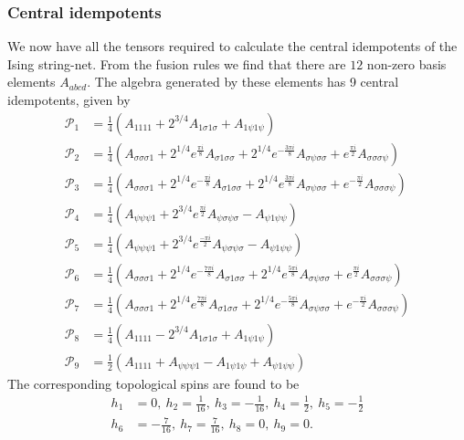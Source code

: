\documentclass[12 pt]{article}
\begin{document}
\subsubsection{Central idempotents}
We now have all the tensors required to calculate the central idempotents of the Ising string-net.
From the fusion rules we find that there are $12$ non-zero basis elements $A_{abcd}$. The algebra generated by these elements has 9 central idempotents, given by
\begin{align*}
\mathcal{P}_1 &=\frac{1}{4}\left(A_{1111}+2^{3/4}A_{1\sigma 1\sigma}+A_{1\psi 1\psi}\right)\\
\mathcal{P}_2 &=\frac{1}{4}\left(A_{\sigma\sigma \sigma 1}+2^{1/4}e^{\frac{\pi i}{8}}A_{\sigma 1\sigma\sigma}+2^{1/4}e^{-\frac{3\pi i}{8}}A_{\sigma\psi\sigma\sigma}+e^{\frac{\pi i}{2}}A_{\sigma\sigma\sigma\psi} \right)\\
\mathcal{P}_3 &=\frac{1}{4}\left(A_{\sigma\sigma \sigma 1}+2^{1/4}e^{-\frac{\pi i}{8}}A_{\sigma 1\sigma\sigma}+2^{1/4}e^{\frac{3\pi i}{8}}A_{\sigma \psi\sigma\sigma}+e^{-\frac{\pi i}{2}}A_{\sigma\sigma\sigma\psi} \right)\\
\mathcal{P}_4 &=\frac{1}{4}\left(A_{\psi\psi\psi1}+2^{3/4}e^{\frac{\pi i}{2}}A_{\psi\sigma\psi\sigma}-A_{\psi 1\psi\psi}\right)\\
\mathcal{P}_5 &=\frac{1}{4}\left(A_{\psi\psi\psi1}+2^{3/4}e^{\frac{-\pi i}{2}}A_{\psi\sigma\psi\sigma}-A_{\psi 1\psi\psi}\right)\\
\mathcal{P}_6 &=\frac{1}{4}\left(A_{\sigma\sigma\sigma 1}+2^{1/4}e^{-\frac{7 \pi i}{8}}A_{\sigma 1\sigma\sigma}+2^{1/4}e^{\frac{5 \pi i}{8}}A_{\sigma \psi\sigma\sigma}+e^{\frac{\pi i}{2}}A_{\sigma\sigma\sigma\psi}\right)\\
\mathcal{P}_7 &=\frac{1}{4}\left(A_{\sigma\sigma\sigma1}+2^{1/4}e^{\frac{7 \pi i}{8}}A_{\sigma 1\sigma\sigma}+2^{1/4}e^{-\frac{5 \pi i}{8}}A_{\sigma\psi\sigma\sigma}+e^{-\frac{\pi i}{2}}A_{\sigma\sigma\sigma\psi}\right)\\
\mathcal{P}_8 &=\frac{1}{4}\left(A_{1111}-2^{3/4}A_{1\sigma 1\sigma}+A_{1\psi 1\psi}\right)\\
\mathcal{P}_9 &=\frac{1}{2}\left(A_{1111}+A_{\psi\psi\psi 1}-A_{1\psi 1\psi}+A_{\psi 1\psi\psi}\right)
\end{align*}
The corresponding topological spins are found to be
\begin{align*}
h_1&=0,\: h_2=\frac{1}{16},\: h_3=-\frac{1}{16},\: h_4=\frac{1}{2}, \: h_5=-\frac{1}{2}\\
h_6&=-\frac{7}{16},\: h_7=\frac{7}{16},\: h_8=0, \: h_9=0.
\end{align*}
\end{document}
